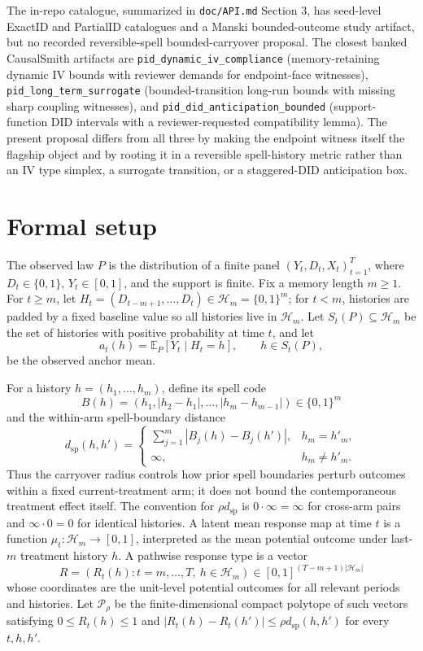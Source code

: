 \documentclass[11pt]{article}
\newcommand{\E}{\mathbb{E}}
\newcommand{\calH}{\mathcal{H}}
\theoremstyle{definition}
\theoremstyle{plain}
\theoremstyle{remark}
\begin{document}
The in-repo catalogue, summarized in \texttt{doc/API.md} Section 3, has seed-level ExactID and PartialID catalogues and a Manski bounded-outcome study artifact, but no recorded reversible-spell bounded-carryover proposal.  The closest banked CausalSmith artifacts are \texttt{pid\_dynamic\_iv\_compliance} (memory-retaining dynamic IV bounds with reviewer demands for endpoint-face witnesses), \texttt{pid\_long\_term\_surrogate} (bounded-transition long-run bounds with missing sharp coupling witnesses), and \texttt{pid\_did\_anticipation\_bounded} (support-function DID intervals with a reviewer-requested compatibility lemma).  The present proposal differs from all three by making the endpoint witness itself the flagship object and by rooting it in a reversible spell-history metric rather than an IV type simplex, a surrogate transition, or a staggered-DID anticipation box.

\section{Formal setup}\label{sec:setup}
The observed law \(P\) is the distribution of a finite panel \((Y_t,D_t,X_t)_{t=1}^T\), where \(D_t\in\{0,1\}\), \(Y_t\in[0,1]\), and the support is finite.  Fix a memory length \(m\ge 1\).  For \(t\ge m\), let \(H_t=(D_{t-m+1},\ldots,D_t)\in\calH_m=\{0,1\}^m\); for \(t<m\), histories are padded by a fixed baseline value so all histories live in \(\calH_m\).  Let \(S_t(P)\subseteq\calH_m\) be the set of histories with positive probability at time \(t\), and let
\[
  a_t(h)=\E_P[Y_t\mid H_t=h],\qquad h\in S_t(P),
\]
be the observed anchor mean.

For a history \(h=(h_1,\ldots,h_m)\), define its spell code
\[
  B(h)=(h_1, |h_2-h_1|,\ldots,|h_m-h_{m-1}|)\in\{0,1\}^m
\]
and the within-arm spell-boundary distance
\[
  d_{\mathrm{sp}}(h,h')=
  \begin{cases}
    \sum_{j=1}^m |B_j(h)-B_j(h')|, & h_m=h'_m,\\
    \infty, & h_m\ne h'_m.
  \end{cases}
\]
Thus the carryover radius controls how prior spell boundaries perturb outcomes within a fixed current-treatment arm; it does not bound the contemporaneous treatment effect itself.  The convention for \(\rho d_{\mathrm{sp}}\) is \(0\cdot\infty=\infty\) for cross-arm pairs and \(\infty\cdot 0=0\) for identical histories.  A latent mean response map at time \(t\) is a function \(\mu_t:\calH_m\to[0,1]\), interpreted as the mean potential outcome under last-\(m\) treatment history \(h\).  A pathwise response type is a vector
\[
  R=(R_t(h):t=m,\ldots,T,\ h\in\calH_m)\in[0,1]^{(T-m+1)|\calH_m|}
\]
whose coordinates are the unit-level potential outcomes for all relevant periods and histories.  Let \(\mathcal P_\rho\) be the finite-dimensional compact polytope of such vectors satisfying \(0\le R_t(h)\le 1\) and \(|R_t(h)-R_t(h')|\le\rho d_{\mathrm{sp}}(h,h')\) for every \(t,h,h'\).
\end{document}
